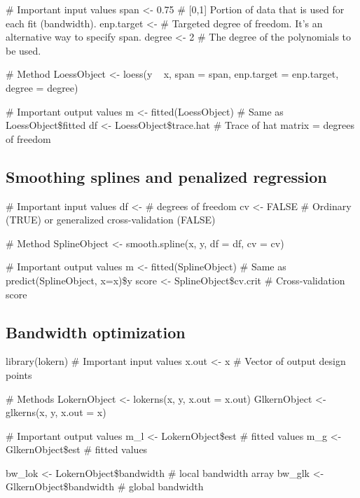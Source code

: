 \begin{code}
 # Important input values
 span <- 0.75 # [0,1] Portion of data that is used for each fit (bandwidth).
 enp.target <- # Targeted degree of freedom. It's an alternative way to specify span.
 degree <- 2 # The degree of the polynomials to be used.
 
 # Method
 LoessObject <- loess(y ~ x, span = span, enp.target = enp.target, degree = degree)
 
 # Important output values
 m <- fitted(LoessObject) # Same as LoessObject\$fitted
 df <- LoessObject\$trace.hat # Trace of hat matrix = degrees of freedom
\end{code}

\subsection{Smoothing splines and penalized regression}
\begin{code}
 # Important input values
 df <- # degrees of freedom
 cv <- FALSE # Ordinary (TRUE) or generalized cross-validation (FALSE)

 # Method
 SplineObject <- smooth.spline(x, y, df = df, cv = cv)
 
 # Important output values
 m <- fitted(SplineObject) # Same as predict(SplineObject, x=x)\$y
 score <- SplineObject\$cv.crit # Cross-validation score
\end{code}

\subsection{Bandwidth optimization}
\begin{code}
 library(lokern)
 # Important input values
 x.out <- x # Vector of output design points
 
 # Methods
 LokernObject <- lokerns(x, y, x.out = x.out)
 GlkernObject <- glkerns(x, y, x.out = x)

 # Important output values
 m_l <- LokernObject\$est # fitted values
 m_g <- GlkernObject\$est # fitted values
 
 bw_lok <- LokernObject\$bandwidth # local bandwidth array
 bw_glk <- GlkernObject\$bandwidth # global bandwidth
\end{code}

